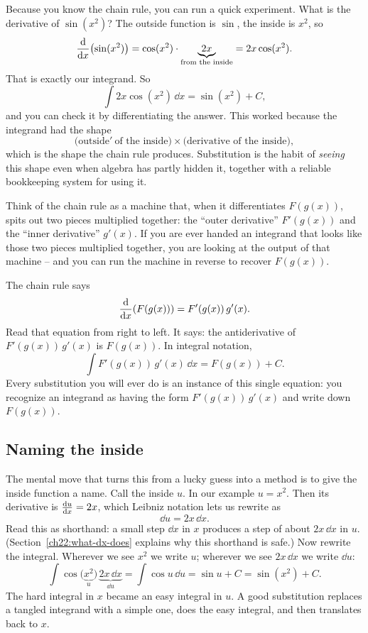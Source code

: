 Because you know the chain rule, you can run a quick experiment. What is the
derivative of $\sin(x^2)$? The outside function is $\sin$, the inside is $x^2$, so
\[
  \frac{\mathrm{d}}{\mathrm{d} x}\!\left(\sin(x^2)\right) = \cos(x^2)\cdot \underbrace{2x}_{\text{from the inside}}
                  = 2x\cos(x^2).
\]
That is exactly our integrand. So
\[
  \int 2x\cos\!\left(x^2\right)\,\dd x = \sin(x^2) + C,
\]
and you can check it by differentiating the answer. This worked
because the integrand had the shape
\[
  \big(\text{outside}'\ \text{of the inside}\big)\times\big(\text{derivative of the inside}\big),
\]
which is the shape the chain rule produces. Substitution is the habit of
\emph{seeing} this shape even when algebra has partly hidden it, together with a
reliable bookkeeping system for using it.

\begin{intuitionbox}
Think of the chain rule as a machine that, when it differentiates $F(g(x))$, spits
out two pieces multiplied together: the ``outer derivative'' $F'(g(x))$ and the
``inner derivative'' $g'(x)$. If you are ever handed an integrand that looks like
those two pieces multiplied together, you are looking at the output of that machine
-- and you can run the machine in reverse to recover $F(g(x))$.
\end{intuitionbox}

\begin{whybox}
The chain rule says
\[
  \frac{\mathrm{d}}{\mathrm{d} x}\!\left(F(g(x))\right) = F'(g(x))\,g'(x).
\]
Read that equation from right to left. It says: the antiderivative of
$F'(g(x))\,g'(x)$ is $F(g(x))$. In integral notation,
\[
  \int F'(g(x))\,g'(x)\,\dd x = F(g(x)) + C.
\]
Every substitution you will ever do is an instance of this single equation: you
recognize an integrand as having the form $F'(g(x))\,g'(x)$ and write down
$F(g(x))$.
\end{whybox}

\subsection{Naming the inside}

The mental move that turns this from a lucky guess into a method is to give the
inside function a name. Call the inside $u$. In our example $u = x^2$. Then its
derivative is $\frac{\mathrm{d} u}{\mathrm{d} x} = 2x$, which Leibniz notation lets us rewrite as
\[
  \dd u = 2x\,\dd x.
\]
Read this as shorthand: a small step $\dd x$ in $x$ produces a step of about
$2x\,\dd x$ in $u$. (Section~\ref{ch22:what-dx-does} explains why this shorthand is
safe.) Now rewrite the integral. Wherever we see $x^2$ we write $u$; wherever we
see $2x\,\dd x$ we write $\dd u$:
\[
  \int \cos\!\big(\underbrace{x^2}_{u}\big)\,\underbrace{2x\,\dd x}_{\dd u}
   = \int \cos u\,\dd u = \sin u + C = \sin(x^2)+C.
\]
The hard integral in $x$ became an easy integral in $u$. A good substitution
replaces a tangled integrand with a simple one, does the easy integral, and then
translates back to $x$.

